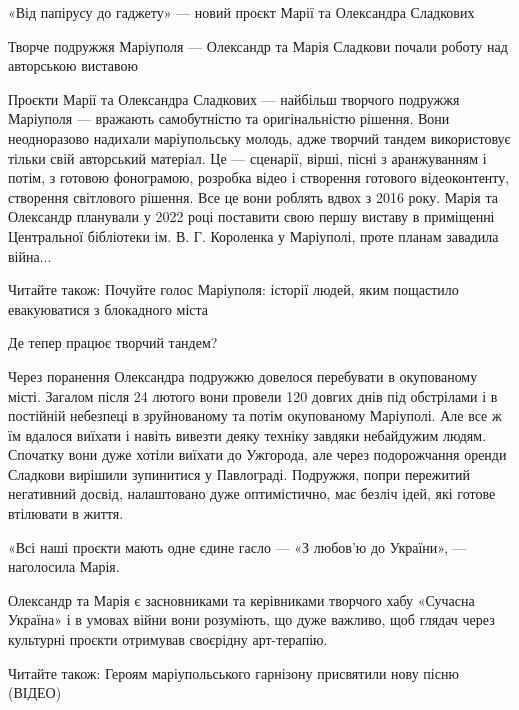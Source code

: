  
 
 
 
 

«Від папірусу до гаджету» — новий проєкт Марії та Олександра Сладкових

Творче подружжя Маріуполя — Олександр та Марія Сладкови почали роботу над авторською виставою

Проєкти Марії та Олександра Сладкових — найбільш творчого подружжя Маріуполя —
вражають самобутністю та оригінальністю рішення. Вони неодноразово надихали
маріупольську молодь, адже творчий тандем використовує тільки свій авторський
матеріал. Це — сценарії, вірші, пісні з аранжуванням і потім, з готовою
фонограмою, розробка відео і створення готового відеоконтенту, створення
світлового рішення. Все це вони роблять вдвох з 2016 року. Марія та Олександр
планували у 2022 році поставити свою першу виставу в приміщенні Центральної
бібліотеки ім. В. Г. Короленка у Маріуполі, проте планам завадила війна...

Читайте також: Почуйте голос Маріуполя: історії людей, яким пощастило
евакуюватися з блокадного міста

Де тепер працює творчий тандем?

Через поранення Олександра подружжю довелося перебувати в окупованому місті.
Загалом після 24 лютого вони провели 120 довгих днів під обстрілами і в
постійній небезпеці в зруйнованому та потім окупованому Маріуполі. Але все ж їм
вдалося виїхати і навіть вивезти деяку техніку завдяки небайдужим людям.
Спочатку вони дуже хотіли виїхати до Ужгорода, але через подорожчання оренди
Сладкови вирішили зупинитися у Павлограді. Подружжя, попри пережитий негативний
досвід, налаштовано дуже оптимістично, має безліч ідей, які готове втілювати в
життя. 

«Всі наші проєкти мають одне єдине гасло —  «З любов'ю до України», —
наголосила Марія.

Олександр та Марія є засновниками та керівниками творчого хабу «Сучасна
Україна» і в умовах війни вони розуміють, що дуже важливо, щоб глядач через
культурні проєкти отримував своєрідну арт-терапію.

Читайте також: Героям маріупольського гарнізону присвятили нову пісню (ВІДЕО)

